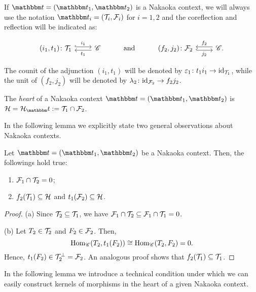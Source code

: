 \begin{notation}
  If $\t=(\t_1,\t_2)$ is a Nakaoka context, we will always use the notation $\t_i = (\T_i,\F_i)$ for $i=1,2$ and the coreflection and reflection will be indicated as:

\begin{equation*}
\begin{tikzcd}
(i_1,t_1)\colon\T_1\arrow[hook, shift left]{r}{i_1}
& \mathscr{C}\arrow[shift left]{l}{t_1}
& \mathrm{and}
& (f_2,j_2)\colon\F_2\arrow[hook, shift right]{r}[']{j_2}
& \mathscr{C}\arrow[shift right]{l}[']{f_2}.
\end{tikzcd}
\end{equation*}

\begin{sloppypar}
The counit of the adjunction $(i_1,t_1)$ will be denoted by ${\varepsilon_1\colon t_1i_1\to \mathrm{id}_{\mathcal{T}_1}}$, while the unit of $(f_2,j_2)$ will be denoted by ${\lambda_2\colon \mathrm{id}_{\mathcal{F}_2}\to f_2j_2}$.
\end{sloppypar}
\end{notation}

\begin{definition}
  The \emph{heart} of a Nakaoka context $\t=(\t_1,\t_2)$ is $\clH=\clH_\t:=\T_1\cap\F_2$.
\end{definition}

In the following lemma we explicitly state two general observations about Nakaoka contexts.

\begin{lemma}\label{5:lem:2}
Let $\t=(\t_1,\t_2)$ be a Nakaoka context. Then, the followings hold true:
\begin{enumerate}[label=(\alph*)]
\item $\mathcal{F}_1\cap\mathcal{T}_2=0$;
\item $f_2(\mathcal{T}_1)\subseteq\mathcal{H}$ and $t_1(\mathcal{F}_2)\subseteq\mathcal{H}$.
\end{enumerate}
\end{lemma}
\begin{proof}
(a) Since $\mathcal{T}_2\subseteq\mathcal{T}_1$, we have $\mathcal{F}_1\cap\mathcal{T}_2\subseteq \mathcal{F}_1\cap\mathcal{T}_1=0$.

\smallskip\noindent
(b) Let $T_2\in\mathcal{T}_2$ and $F_2\in\mathcal{F}_2$. Then, \[\operatorname{Hom}_\mathscr{C}(T_2,t_1(F_2))\cong \operatorname{Hom}_\mathscr{C}(T_2,F_2)=0.\]
Hence, $t_1(F_2)\in\mathcal{T}_2^\perp = \mathcal{F}_2$. An analogous proof shows that $f_2(\mathcal{T}_1)\subseteq\mathcal{T}_1$.
\end{proof}

In the following lemma we introduce a technical condition under which we can easily construct kernels of morphisms in the heart of a given Nakaoka context.


